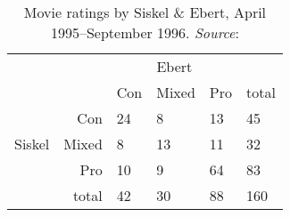 \begin{table}[!htb]
\centering
\caption{Movie ratings by Siskel \& Ebert, April 1995--September 1996. \emph{Source}: \citet{AgrestiWinner:1997}}\label{tab:siskel-ebert}
\begin{tabular}{rr|lll|l}
        &       &  \multicolumn{3}{|c|}{Ebert} \\
        &       & Con & Mixed & Pro & total \\ \hline
        & Con   &  24 &   8   &  13 &  45   \\
 Siskel & Mixed &   8 &  13   &  11 &  32   \\
        & Pro   &  10 &   9   &  64 &  83   \\ \hline
        & total &  42 &  30   &  88 & 160   \\
\end{tabular}
\end{table}